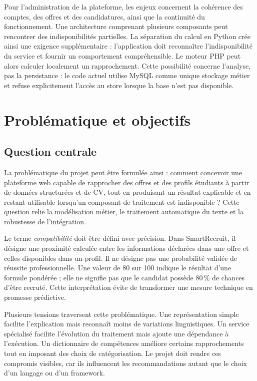 Pour l'administration de la plateforme, les enjeux concernent la cohérence des comptes, des offres et des candidatures, ainsi que la continuité du fonctionnement. Une architecture comprenant plusieurs composants peut rencontrer des indisponibilités partielles. La séparation du calcul en Python crée ainsi une exigence supplémentaire : l'application doit reconnaître l'indisponibilité du service et fournir un comportement compréhensible. Le moteur PHP peut alors calculer localement un rapprochement. Cette possibilité concerne l'analyse, pas la persistance : le code actuel utilise MySQL comme unique stockage métier et refuse explicitement l'accès au store lorsque la base n'est pas disponible.

\section{Problématique et objectifs}

\subsection{Question centrale}

La problématique du projet peut être formulée ainsi : comment concevoir une plateforme web capable de rapprocher des offres et des profils étudiants à partir de données structurées et de CV, tout en produisant un résultat explicable et en restant utilisable lorsqu'un composant de traitement est indisponible ? Cette question relie la modélisation métier, le traitement automatique du texte et la robustesse de l'intégration.

Le terme \emph{compatibilité} doit être défini avec précision. Dans SmartRecruit, il désigne une proximité calculée entre les informations déclarées dans une offre et celles disponibles dans un profil. Il ne désigne pas une probabilité validée de réussite professionnelle. Une valeur de 80 sur 100 indique le résultat d'une formule pondérée ; elle ne signifie pas que le candidat possède 80\,\% de chances d'être recruté. Cette interprétation évite de transformer une mesure technique en promesse prédictive.

Plusieurs tensions traversent cette problématique. Une représentation simple facilite l'explication mais reconnaît moins de variations linguistiques. Un service spécialisé facilite l'évolution du traitement mais ajoute une dépendance à l'exécution. Un dictionnaire de compétences améliore certains rapprochements tout en imposant des choix de catégorisation. Le projet doit rendre ces compromis visibles, car ils influencent les recommandations autant que le choix d'un langage ou d'un framework.

